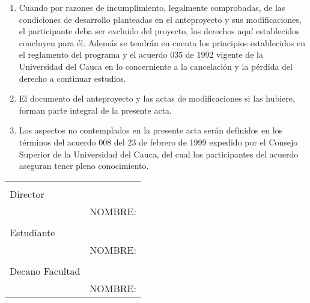 \begin{enumerate}[topsep=0pt, leftmargin=0.6cm, label=\arabic*.-]
    \item Cuando por razones de incumplimiento, legalmente comprobadas, de las condiciones de desarrollo planteadas en el anteproyecto y sus modificaciones, el participante deba ser excluido del proyecto, los derechos aquí establecidos concluyen para él.  Además se tendrán en cuenta los principios establecidos en el reglamento del programa y el acuerdo 035 de 1992 vigente de la Universidad del Cauca en lo concerniente a la cancelación y la pérdida del derecho a continuar estudios.
    
    \item El documento del anteproyecto y las actas de modificaciones si las hubiere, forman parte integral de la presente acta.
    
    \item Los aspectos no contemplados en la presente acta serán definidos en los términos del acuerdo 008 del 23 de febrero de 1999 expedido por el Consejo Superior de la Universidad del Cauca, del cual los participantes del acuerdo aseguran tener pleno conocimiento.

\end{enumerate}

\begin{table}[!h]
    \centering
    \begin{tabular}{m{} m{}}
        
        & \\
        
        Director & \\
        \cline{2-2}
        & NOMBRE: \\
        
        & \\
        
        Estudiante & \\
        \cline{2-2}
        & NOMBRE: \\
        
        & \\
        
        Decano Facultad & \\
        \cline{2-2}
        & NOMBRE: \\

    \end{tabular}
\end{table}

\makeatother